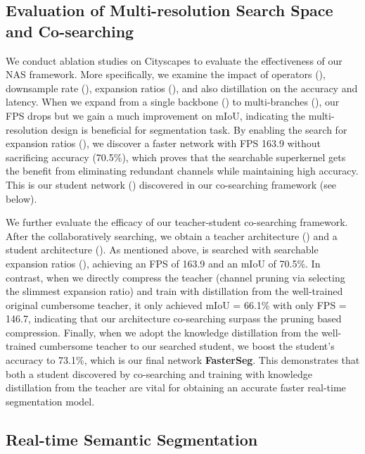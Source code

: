 \documentclass{article} \usepackage{iclr2020_conference,times}
\begin{document}
\subsection{Evaluation of Multi-resolution Search Space and Co-searching}\vspace{-0.5em}
We conduct ablation studies on Cityscapes to evaluate the effectiveness of our NAS framework. More specifically, we examine the impact of operators (), downsample rate (), expansion ratios (), and also distillation on the accuracy and latency. When we expand from a single backbone () to multi-branches (), our FPS drops but we gain a much improvement on mIoU, indicating the multi-resolution design is beneficial for segmentation task. By enabling the search for expansion ratios (), we discover a faster network with FPS 163.9 without sacrificing accuracy (70.5\%), which proves that the searchable superkernel gets the benefit from eliminating redundant channels while maintaining high accuracy. This is our student network () discovered in our co-searching framework (see below).

We further evaluate the efficacy of our teacher-student co-searching framework.
After the collaboratively searching, we obtain a teacher architecture () and a student architecture (). As mentioned above,  is searched with searchable expansion ratios (), achieving an FPS of 163.9 and an mIoU of 70.5\%. In contrast, when we directly compress the teacher (channel pruning via selecting the slimmest expansion ratio) and train with distillation from the well-trained original cumbersome teacher, it only achieved mIoU = 66.1\% with only FPS = 146.7, indicating that our architecture co-searching surpass the pruning based compression. Finally, when we adopt the knowledge distillation from the well-trained cumbersome teacher to our searched student, we boost the student's accuracy to 73.1\%, which is our final network \textbf{FasterSeg}. This demonstrates that both a student discovered by co-searching and training with knowledge distillation from the teacher are vital for obtaining an accurate faster real-time segmentation model.\vspace{-0.5em}







\subsection{Real-time Semantic Segmentation}\vspace{-0.5em}
\end{document}
